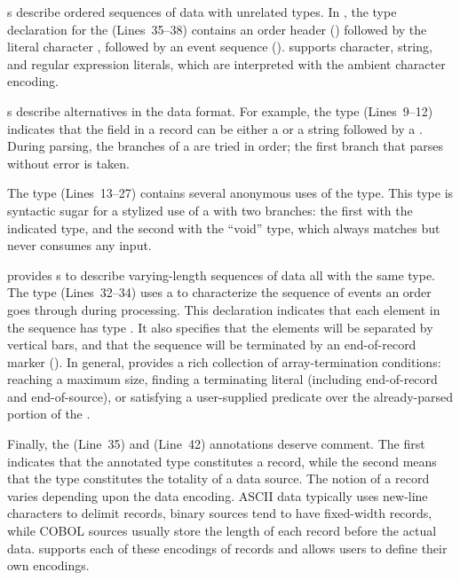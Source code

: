 
s describe ordered sequences of data with unrelated types.
In , the type declaration for the 
 (Lines~35--38)
contains an order header
() followed by the literal character ,
followed by an event sequence ().  \pads{} supports
character, string, and regular expression literals, which are
interpreted with the ambient character encoding.

s describe alternatives in the data format.  For example,
the  type (Lines~9--12) indicates
that the  field in a \dibbler{} record can be either a
 or a string  followed by a .
During parsing, the branches of a  are tried in order; the
first branch that parses without error is taken.  

The  type (Lines~13--27) contains several anonymous uses of the
 type.  This type is syntactic sugar for a stylized use of a
 with two branches: the first with the indicated type, and
the second with the ``void'' type, which always matches but never
consumes any input.

\pads{} provides s to describe varying-length sequences of
data all with the same type.  The  type (Lines~32--34) uses a
 to characterize the sequence of events an order goes
through during processing.  This declaration indicates that each
element in the sequence has type .  It also specifies
that the elements will be separated by vertical bars, and that the
sequence will be terminated by an end-of-record marker ().
In general, \pads{} provides a rich collection of array-termination
conditions: reaching a maximum size, finding a terminating literal
(including end-of-record and end-of-source), or satisfying a
user-supplied predicate over the already-parsed portion of the
.

Finally, the  (Line~35) and  (Line~42) annotations deserve comment.  The first
indicates that the annotated type constitutes a record,
while the second means that the type constitutes the totality of a data source.  
The notion of a record varies depending upon the data encoding.  
ASCII data typically uses new-line characters to delimit 
records, binary sources tend to have fixed-width records, while 
COBOL sources usually store the length of each record before the actual data.
\pads{} supports each of these encodings of records and allows users to define
their own encodings.  

